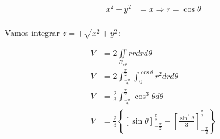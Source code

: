 \documentclass{article}
\newcommand{\doubleintp}[1] {\iint\limits_{R_{r\theta}} #1 r dr d\theta}
\begin{document}
        \begin{align*}
            x^2 + y^2 &= x \Rightarrow r = \cos{\theta}\\
        \end{align*}

        Vamos integrar $z = +\sqrt{ x^2 + y^2 }$:

        \begin{align*}
            V &= 2 \doubleintp{r}\\
            V &= 2 \int_{\frac{-\pi}{2}}^{\frac{\pi}{2}} \int_0^{\cos{\theta}} r^2 dr d\theta\\
            V &= \frac{2}{3} \int_{\frac{-\pi}{2}}^{\frac{\pi}{2}} \cos^3{\theta} d\theta\\
            V &= \frac{2}{3} \left\{ \left[ \sin{\theta} \right]_{-\frac{\pi}{2}}^{\frac{\pi}{2}} - \left[ \frac{\sin^3{\theta}}{3} \right]_{-\frac{\pi}{2}}^{\frac{\pi}{2}}  \right\}
        \end{align*}
\end{document}
